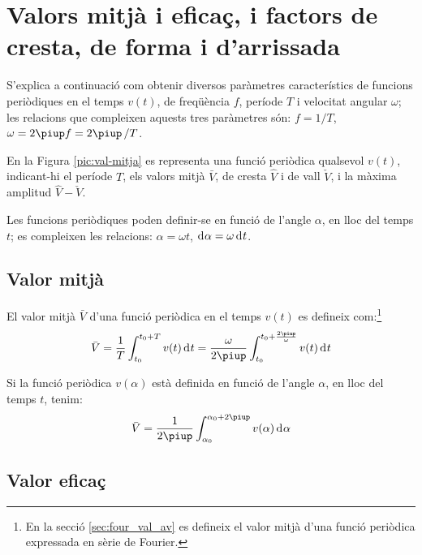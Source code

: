\section{Valors mitjà i eficaç, i factors de cresta, de forma i
d'arrissada}\label{sec:val_mitja_ef}

S'explica a continuació com obtenir diversos paràmetres característics de funcions periòdiques  en el temps $v(t)$, de freqüència $f$, període $T$ i velocitat angular $\omega$; les relacions que compleixen aquests tres paràmetres són: $f = 1/T$, $\omega=2\piup f = 2\piup\,/T$.

En la Figura \vref{pic:val-mitja} es representa una funció periòdica qualsevol $v(t)$, indicant-hi el període $T$, els valors mitjà $\bar{V}$, de cresta $\hat{V}$ i de vall $\check{V}$, i la màxima amplitud  $\hat{V}-\check{V}$.
\begin{center}
    
    \label{pic:val-mitja}
\end{center}

Les funcions periòdiques poden  definir-se en funció de l'angle $\alpha$, en lloc del temps $t$; es compleixen les relacions:
$\alpha=\omega t$, $\diff\alpha=\omega\diff t$.

\subsection{Valor mitjà}

El valor mitjà $\bar{V}$ d'una funció
periòdica en el temps $v(t)$ es
defineix com:\footnote{En la secció \ref{sec:four_val_av} es defineix el valor mitjà d'una funció periòdica expressada en sèrie de Fourier.}
\begin{equation}
    \bar{V} = \frac{1}{T} \int_{t_0}^{t_0+T} v(t) \diff t =
    \frac{\omega}{2\piup} \int_{t_0}^{t_0+\frac{2\piup}{\omega}} v(t) \diff t\label{eq:vm_t}
\end{equation}

Si la funció periòdica $v(\alpha)$ està definida en funció de
l'angle $\alpha$, en lloc del temps $t$, tenim:
\begin{equation}
    \bar{V} = \frac{1}{2\piup} \int_{\alpha_0}^{\alpha_0+2\piup} v(\alpha) \diff \alpha
    \label{eq:vm_alfa}
\end{equation}

\subsection{Valor eficaç}

